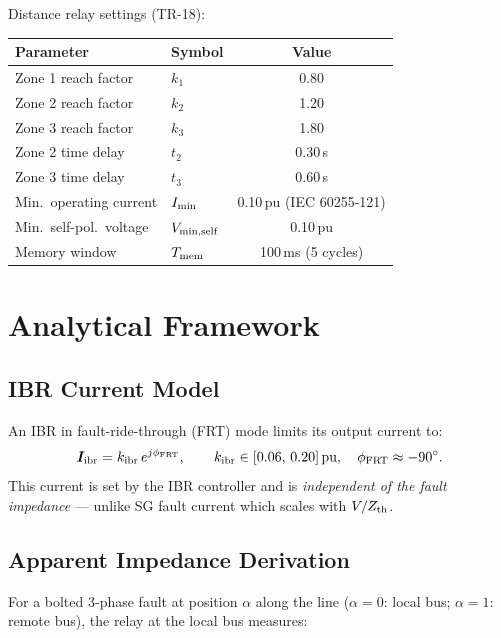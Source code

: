 \documentclass[11pt,a4paper]{article}
\begin{document}
Distance relay settings (TR-18):

\begin{center}
\begin{tabular}{llc}
\toprule
Parameter & Symbol & Value \\
\midrule
Zone 1 reach factor & $k_1$ & 0.80 \\
Zone 2 reach factor & $k_2$ & 1.20 \\
Zone 3 reach factor & $k_3$ & 1.80 \\
Zone 2 time delay   & $t_2$ & 0.30\,s \\
Zone 3 time delay   & $t_3$ & 0.60\,s \\
Min.\ operating current & $I_{\rm min}$ & 0.10\,pu (IEC 60255-121) \\
Min.\ self-pol.\ voltage & $V_{\rm min,self}$ & 0.10\,pu \\
Memory window & $T_{\rm mem}$ & 100\,ms (5 cycles) \\
\bottomrule
\end{tabular}
\end{center}

\section{Analytical Framework}

\subsection{IBR Current Model}

An IBR in fault-ride-through (FRT) mode limits its output current to:
\begin{equation}
  \bm{I}_{\rm ibr} = k_{\rm ibr}\,e^{j\phi_{\rm FRT}},
  \qquad k_{\rm ibr} \in [0.06,\,0.20]\,\text{pu},
  \quad \phi_{\rm FRT} \approx -90^\circ.
  \label{eq:ibr_current}
\end{equation}
This current is set by the IBR controller and is \emph{independent of the
fault impedance} — unlike SG fault current which scales with $V/Z_{\rm th}$.

\subsection{Apparent Impedance Derivation}

For a bolted 3-phase fault at position $\alpha$ along the line
($\alpha = 0$: local bus; $\alpha = 1$: remote bus), the relay at the
local bus measures:
\end{document}
